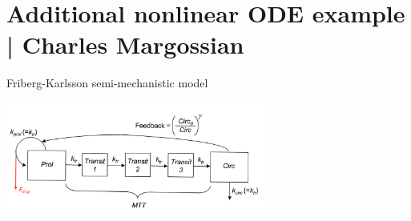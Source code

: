 \documentclass[presentation, allowframebreaks]{beamer}
\begin{document}
\section{Additional nonlinear ODE example | \footnotesize{Charles Margossian}}
\label{sec:orgf608b9c}
\begin{frame}[label={sec:org596614e}]{Friberg-Karlsson semi-mechanistic model \cite{Friberg:2002}}
\begin{center}
  \includegraphics[width=8.5cm]{Friberg-Karlsson_drug}
\end{center}
\end{frame}
\end{document}
